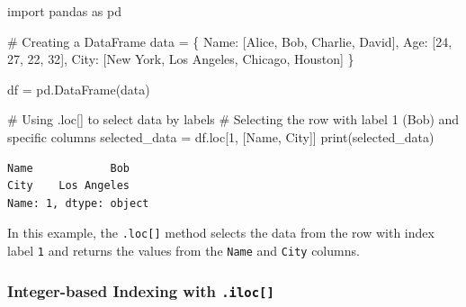 \documentclass[
  letterpaper,
  DIV=11,
  numbers=noendperiod]{scrreprt}
\newenvironment{Shaded}{\begin{snugshade}}{\end{snugshade}}
\newcommand{\BuiltInTok}[1]{\textcolor[rgb]{0.00,0.23,0.31}{#1}}
\newcommand{\CommentTok}[1]{\textcolor[rgb]{0.37,0.37,0.37}{#1}}
\newcommand{\DecValTok}[1]{\textcolor[rgb]{0.68,0.00,0.00}{#1}}
\newcommand{\ImportTok}[1]{\textcolor[rgb]{0.00,0.46,0.62}{#1}}
\newcommand{\NormalTok}[1]{\textcolor[rgb]{0.00,0.23,0.31}{#1}}
\newcommand{\OperatorTok}[1]{\textcolor[rgb]{0.37,0.37,0.37}{#1}}
\newcommand{\StringTok}[1]{\textcolor[rgb]{0.13,0.47,0.30}{#1}}
\begin{document}
\begin{Shaded}
\begin{Highlighting}[]
\ImportTok{import}\NormalTok{ pandas }\ImportTok{as}\NormalTok{ pd}

\CommentTok{\# Creating a DataFrame}
\NormalTok{data }\OperatorTok{=}\NormalTok{ \{}
    \StringTok{\textquotesingle{}Name\textquotesingle{}}\NormalTok{: [}\StringTok{\textquotesingle{}Alice\textquotesingle{}}\NormalTok{, }\StringTok{\textquotesingle{}Bob\textquotesingle{}}\NormalTok{, }\StringTok{\textquotesingle{}Charlie\textquotesingle{}}\NormalTok{, }\StringTok{\textquotesingle{}David\textquotesingle{}}\NormalTok{],}
    \StringTok{\textquotesingle{}Age\textquotesingle{}}\NormalTok{: [}\DecValTok{24}\NormalTok{, }\DecValTok{27}\NormalTok{, }\DecValTok{22}\NormalTok{, }\DecValTok{32}\NormalTok{],}
    \StringTok{\textquotesingle{}City\textquotesingle{}}\NormalTok{: [}\StringTok{\textquotesingle{}New York\textquotesingle{}}\NormalTok{, }\StringTok{\textquotesingle{}Los Angeles\textquotesingle{}}\NormalTok{, }\StringTok{\textquotesingle{}Chicago\textquotesingle{}}\NormalTok{, }\StringTok{\textquotesingle{}Houston\textquotesingle{}}\NormalTok{]}
\NormalTok{\}}

\NormalTok{df }\OperatorTok{=}\NormalTok{ pd.DataFrame(data)}

\CommentTok{\# Using .loc[] to select data by labels}
\CommentTok{\# Selecting the row with label 1 (Bob) and specific columns}
\NormalTok{selected\_data }\OperatorTok{=}\NormalTok{ df.loc[}\DecValTok{1}\NormalTok{, [}\StringTok{\textquotesingle{}Name\textquotesingle{}}\NormalTok{, }\StringTok{\textquotesingle{}City\textquotesingle{}}\NormalTok{]]}
\BuiltInTok{print}\NormalTok{(selected\_data)}
\end{Highlighting}
\end{Shaded}

\begin{verbatim}
Name            Bob
City    Los Angeles
Name: 1, dtype: object
\end{verbatim}

In this example, the \texttt{.loc{[}{]}} method selects the data from
the row with index label \texttt{1} and returns the values from the
\texttt{Name} and \texttt{City} columns.

\hypertarget{integer-based-indexing-with-.iloc}{%
\subsubsection{\texorpdfstring{Integer-based Indexing with
\texttt{.iloc{[}{]}}}{Integer-based Indexing with .iloc{[}{]}}}\label{integer-based-indexing-with-.iloc}}
\end{document}
